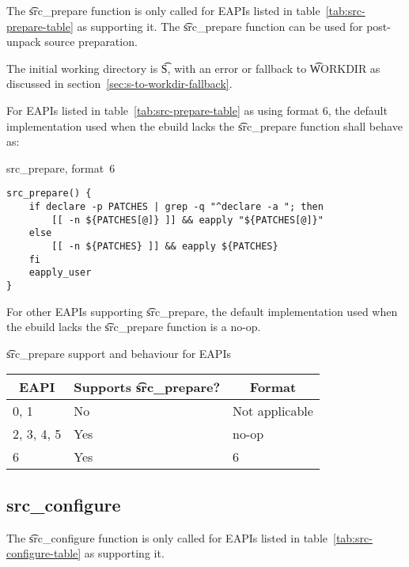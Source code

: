  The \t{src\_prepare} function is only called for EAPIs listed in
table~\ref{tab:src-prepare-table} as supporting it. The \t{src\_prepare} function can be used for
post-unpack source preparation.

The initial working directory is \t{S}, with an error or fallback to \t{WORKDIR} as discussed in
section~\ref{sec:s-to-workdir-fallback}.

 For EAPIs listed in table~\ref{tab:src-prepare-table} as using format
6, the default implementation used when the ebuild lacks the \t{src\_prepare} function shall behave
as:

\begin{listing}[H]
\caption{src\_prepare, format~6}
\begin{verbatim}
src_prepare() {
    if declare -p PATCHES | grep -q "^declare -a "; then
        [[ -n ${PATCHES[@]} ]] && eapply "${PATCHES[@]}"
    else
        [[ -n ${PATCHES} ]] && eapply ${PATCHES}
    fi
    eapply_user
}
\end{verbatim}
\end{listing}

For other EAPIs supporting \t{src\_prepare}, the default implementation used when the ebuild lacks
the \t{src\_prepare} function is a no-op.

\begin{centertable}{\t{src\_prepare} support and behaviour for EAPIs}
    \label{tab:src-prepare-table}
    \begin{tabular}{lll}
      \toprule
      \multicolumn{1}{c}{\textbf{EAPI}} &
      \multicolumn{1}{c}{\textbf{Supports \t{src\_prepare}?}} &
      \multicolumn{1}{c}{\textbf{Format}} \\
      \midrule
      0, 1              & No  & Not applicable \\
      2, 3, 4, 5        & Yes & no-op          \\
      6                 & Yes & 6              \\
      \bottomrule
    \end{tabular}
\end{centertable}

\subsection{src\_configure}

 The \t{src\_configure} function is only called for EAPIs listed in
table~\ref{tab:src-configure-table} as supporting it.

